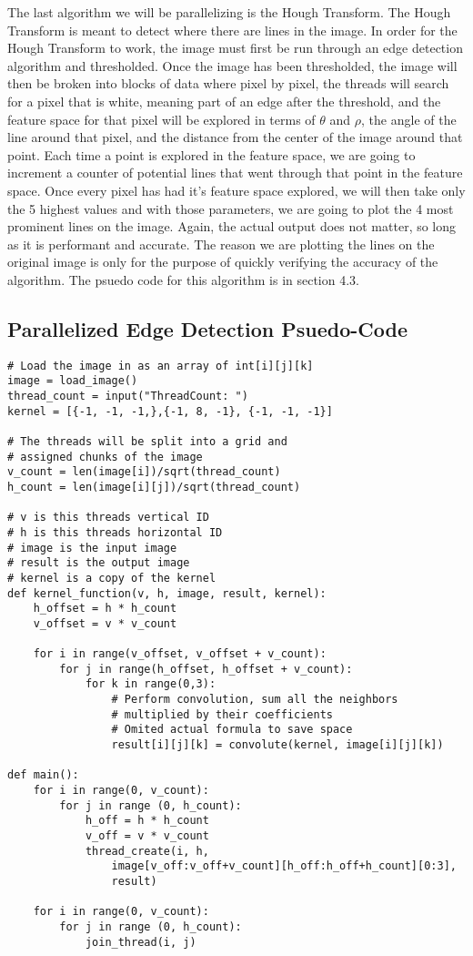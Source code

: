 \documentclass{article}
\begin{document}
        The last algorithm we will be parallelizing is the Hough Transform.  The Hough Transform is meant to detect where there are lines in the image.  In order for the Hough Transform to work, the image must first be run through an edge detection algorithm and thresholded.  Once the image has been thresholded, the image will then be broken into blocks of data where pixel by pixel, the threads will search for a pixel that is white, meaning part of an edge after the threshold, and the feature space for that pixel will be explored in terms of $\theta$ and $\rho$, the angle of the line around that pixel, and the distance from the center of the image around that point.  Each time a point is explored in the feature space, we are going to increment a counter of potential lines that went through that point in the feature space.  Once every pixel has had it's feature space explored, we will then take only the 5 highest values and with those parameters, we are going to plot the 4 most prominent lines on the image.  Again, the actual output does not matter, so long as it is performant and accurate.  The reason we are plotting the lines on the original image is only for the purpose of quickly verifying the accuracy of the algorithm.  The psuedo code for this algorithm is in section 4.3.
        \pagebreak
        
        \subsection{Parallelized Edge Detection Psuedo-Code}
        \begin{lstlisting}
# Load the image in as an array of int[i][j][k]
image = load_image()
thread_count = input("ThreadCount: ")
kernel = [{-1, -1, -1,},{-1, 8, -1}, {-1, -1, -1}]

# The threads will be split into a grid and 
# assigned chunks of the image
v_count = len(image[i])/sqrt(thread_count)
h_count = len(image[i][j])/sqrt(thread_count)

# v is this threads vertical ID
# h is this threads horizontal ID
# image is the input image
# result is the output image
# kernel is a copy of the kernel
def kernel_function(v, h, image, result, kernel):
    h_offset = h * h_count
    v_offset = v * v_count
    
    for i in range(v_offset, v_offset + v_count):
        for j in range(h_offset, h_offset + v_count):
            for k in range(0,3):
                # Perform convolution, sum all the neighbors 
                # multiplied by their coefficients
                # Omited actual formula to save space
                result[i][j][k] = convolute(kernel, image[i][j][k])

def main():
    for i in range(0, v_count):
        for j in range (0, h_count):
            h_off = h * h_count
            v_off = v * v_count
            thread_create(i, h, 
                image[v_off:v_off+v_count][h_off:h_off+h_count][0:3], 
                result)
                
    for i in range(0, v_count):
        for j in range (0, h_count):
            join_thread(i, j)

        \end{lstlisting}
        \pagebreak       
        
\end{document}
